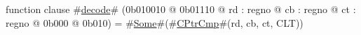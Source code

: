 function clause #\hyperref[zdecode]{decode}# (0b010010 @ 0b01110 @ rd : regno @ cb : regno @ ct : regno @ 0b000 @ 0b010) = #\hyperref[zSome]{Some}#(#\hyperref[zCPtrCmp]{CPtrCmp}#(rd, cb, ct, CLT))
